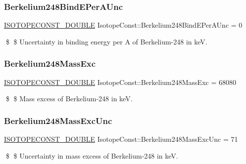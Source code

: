 \subsubsection{\texorpdfstring{Berkelium248\+Bind\+E\+Per\+A\+Unc}{Berkelium248BindEPerAUnc}}
{\footnotesize\ttfamily \mbox{\hyperlink{group___isotope_const-_macros_ga8f45a7272ce02c0b4c65c44636ed719a}{I\+S\+O\+T\+O\+P\+E\+C\+O\+N\+S\+T\+\_\+\+D\+O\+U\+B\+LE}} Isotope\+Const\+::\+Berkelium248\+Bind\+E\+Per\+A\+Unc = 0}

\$ \$ Uncertainty in binding energy per A of Berkelium-\/248 in keV. \mbox{\label{group___isotope_const-_berkelium-_bk248_ga1eae90bd26003ea7814aeb9dd666ee2f}} 
\subsubsection{\texorpdfstring{Berkelium248\+Mass\+Exc}{Berkelium248MassExc}}
{\footnotesize\ttfamily \mbox{\hyperlink{group___isotope_const-_macros_ga8f45a7272ce02c0b4c65c44636ed719a}{I\+S\+O\+T\+O\+P\+E\+C\+O\+N\+S\+T\+\_\+\+D\+O\+U\+B\+LE}} Isotope\+Const\+::\+Berkelium248\+Mass\+Exc = 68080}

\$ \$ Mass excess of Berkelium-\/248 in keV. \mbox{\label{group___isotope_const-_berkelium-_bk248_gab643220f83f139904b78b324a3b8f12c}} 
\subsubsection{\texorpdfstring{Berkelium248\+Mass\+Exc\+Unc}{Berkelium248MassExcUnc}}
{\footnotesize\ttfamily \mbox{\hyperlink{group___isotope_const-_macros_ga8f45a7272ce02c0b4c65c44636ed719a}{I\+S\+O\+T\+O\+P\+E\+C\+O\+N\+S\+T\+\_\+\+D\+O\+U\+B\+LE}} Isotope\+Const\+::\+Berkelium248\+Mass\+Exc\+Unc = 71}

\$ \$ Uncertainty in mass excess of Berkelium-\/248 in keV. \mbox{\label{group___isotope_const-_berkelium-_bk248_gaf697a3518c9178b1662059bb59ffe5e9}} 
